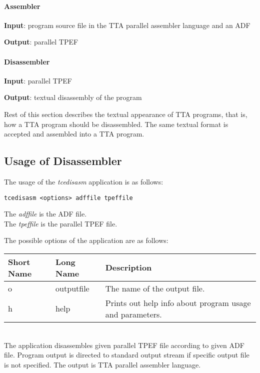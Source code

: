 \documentclass[twoside]{tceusermanual}
\begin{document}
\paragraph{Assembler}

\textbf{Input}: program source file in the TTA parallel assembler language
and an ADF

\textbf{Output}: parallel TPEF

\paragraph{Disassembler}

\textbf{Input}: parallel TPEF

\textbf{Output}: textual disassembly of the program

Rest of this section describes the textual appearance of TTA programs, that
is, how a TTA program should be disassembled.  The same textual format is
accepted and assembled into a TTA program.

\subsection{Usage of Disassembler}

The usage of the \emph{tcedisasm} application is as follows:

\begin{verbatim}
tcedisasm <options> adffile tpeffile
\end{verbatim}

The \emph{adffile} is the ADF file. \\
The \emph{tpeffile} is the parallel TPEF file.

The possible options of the application are as follows:\\

\begin{tabular}{p{}p{}
                p{}}
\textbf{Short Name} &\textbf{Long Name} &\textbf{Description} \\
\hline
o & outputfile  & The name of the output file.\\
h & help        & Prints out help info about program usage and parameters.\\
\end{tabular}\\

The application disassembles given parallel TPEF file according to given ADF
file. Program output is directed to standard output stream if specific output
file is not specified. The output is TTA parallel assembler language.
\end{document}
